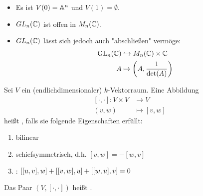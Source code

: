 	\begin{itemize}
		\item Es ist $V(0) = \aff^n$ und $V(1) = \emptyset$.
		\item $GL_n(\CC)$ ist offen in $M_n(\CC)$.
		\item $GL_n(\CC)$ lässt sich jedoch auch "abschließen" vermöge:
		\begin{equation}
		\begin{aligned}
			\GL_n(\CC) &\hookrightarrow M_n(\CC) \times \CC \\
			A &\mapsto \enbrace*{A, \frac{1}{\det(A)}}
		\end{aligned}
		\end{equation}
	\end{itemize}

\setlength{\fboxsep}{10pt}
\setlength{\fboxrule}{3pt}
\begin{center}
\end{center}

\begin{defn} \label{1.4}
	Sei $V$ ein (endlichdimensionaler) $k$-Vektorraum. Eine Abbildung
	\begin{equation}
	\begin{aligned}
		[\cdot,\cdot]\colon V \times V &\longrightarrow V \\
		(v,w) &\longmapsto [v,w]
	\end{aligned}
	\end{equation}
	heißt , falls sie folgende Eigenschaften erfüllt:
	\begin{enumerate}[1)]
		\item bilinear
		\item schiefsymmetrisch, d.h. $[v,w] = -[w,v]$
		\item {}: $\benbrace*{[u,v],w}+\benbrace*{[v,w],u}+\benbrace*{[w,u],v} = 0$
	\end{enumerate}
	Das Paar $(V,[\cdot,\cdot])$ heißt .
\end{defn}

